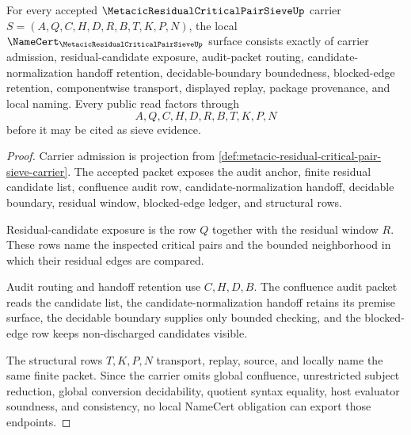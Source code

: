 \begin{theorem}
\label{thm:metacic-residual-critical-pair-sieve-namecert-obligations}
For every accepted $\MetacicResidualCriticalPairSieveUp$ carrier $S=(A,Q,C,H,D,R,B,T,K,P,N)$, the local $\NameCert_{\MetacicResidualCriticalPairSieveUp}$ surface consists exactly of carrier admission, residual-candidate exposure, audit-packet routing, candidate-normalization handoff retention, decidable-boundary boundedness, blocked-edge retention, componentwise transport, displayed replay, package provenance, and local naming. Every public read factors through
$$
A,Q,C,H,D,R,B,T,K,P,N
$$
before it may be cited as sieve evidence.
\end{theorem}
\begin{proof}
Carrier admission is projection from \autoref{def:metacic-residual-critical-pair-sieve-carrier}. The accepted packet exposes the audit anchor, finite residual candidate list, confluence audit row, candidate-normalization handoff, decidable boundary, residual window, blocked-edge ledger, and structural rows.

Residual-candidate exposure is the row $Q$ together with the residual window $R$. These rows name the inspected critical pairs and the bounded neighborhood in which their residual edges are compared.

Audit routing and handoff retention use $C,H,D,B$. The confluence audit packet reads the candidate list, the candidate-normalization handoff retains its premise surface, the decidable boundary supplies only bounded checking, and the blocked-edge row keeps non-discharged candidates visible.

The structural rows $T,K,P,N$ transport, replay, source, and locally name the same finite packet. Since the carrier omits global confluence, unrestricted subject reduction, global conversion decidability, quotient syntax equality, host evaluator soundness, and consistency, no local NameCert obligation can export those endpoints.
\end{proof}


